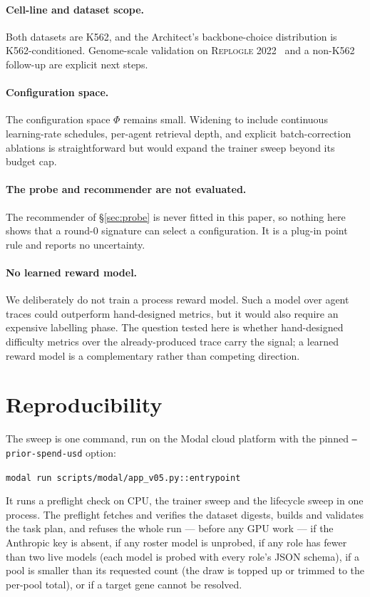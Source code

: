 \documentclass[10pt,a4paper]{article}
\begin{document}
\paragraph{Cell-line and dataset scope.} Both datasets are K562, and the
Architect's backbone-choice distribution is K562-conditioned. Genome-scale
validation on \textsc{Replogle 2022}~\citep{replogle2022perturbseq} and a
non-K562 follow-up are explicit next steps.

\paragraph{Configuration space.} The configuration space $\Phi$ remains small. Widening to
include continuous learning-rate schedules, per-agent retrieval depth,
and explicit batch-correction ablations is straightforward but would
expand the trainer sweep beyond its budget cap.

\paragraph{The probe and recommender are not evaluated.} The recommender of
\S\ref{sec:probe} is never fitted in this paper, so nothing here shows that a
round-$0$ signature can select a configuration. It is a plug-in point rule and
reports no uncertainty.

\paragraph{No learned reward model.} We deliberately do not train a
process reward model. Such a model over agent traces could outperform hand-designed
metrics, but it would also require an expensive labelling phase. The
question tested here is whether hand-designed difficulty metrics over the
already-produced trace carry the signal; a learned reward model is a complementary
rather than competing direction.

\section{Reproducibility}\label{sec:reproducibility}

The sweep is one command, run on the Modal cloud platform with the pinned
\texttt{--prior-spend-usd} option:
\begin{center}
\texttt{modal run scripts/modal/app\_v05.py::entrypoint}
\end{center}
It runs a preflight check on CPU, the trainer sweep and the lifecycle sweep in one process.
The preflight fetches and verifies the dataset digests, builds and validates
the task plan, and refuses the whole run --- before any GPU work --- if the
Anthropic key is absent, if any roster model is unprobed, if any role has fewer
than two live models (each model is probed with every role's JSON schema), if a
pool is smaller than its requested count (the draw is topped up or trimmed to the
per-pool total), or if a target gene cannot be resolved.
\end{document}

